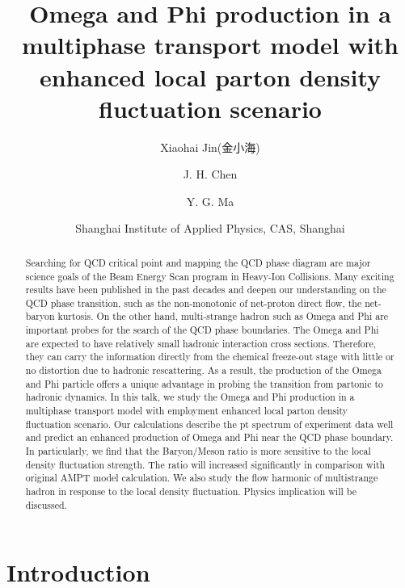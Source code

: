 \documentclass[11pt,a4paper,openany]{article}
\title{\vspace{-20mm}\textbf{\Large Omega and Phi production in a multiphase transport model with enhanced local parton
density fluctuation scenario}}
\author{Xiaohai Jin(金小海) \and J. H. Chen \and Y. G. Ma}
\date{Shanghai Institute of Applied Physics, CAS, Shanghai}
\begin{document}
\maketitle

\begin{abstract}
  Searching for QCD critical point and mapping the QCD phase diagram are major science goals of the Beam Energy Scan program in Heavy-Ion Collisions. Many exciting results have been published in the past decades and deepen our understanding on the QCD phase transition, such as the non-monotonic of net-proton direct flow, the net-baryon kurtosis. On the other hand, multi-strange hadron such as Omega and Phi are important probes for the search of the QCD phase boundaries. The Omega and Phi are expected to have relatively small hadronic interaction cross sections. Therefore, they can carry the information directly from the chemical freeze-out stage with little or no distortion due to hadronic rescattering. As a result, the production of the Omega and Phi particle offers a unique advantage in probing the transition from partonic to hadronic dynamics.  In this talk, we study the Omega and Phi production in a multiphase transport model with employment enhanced local parton density fluctuation scenario. Our calculations describe the pt spectrum of experiment data well and predict an enhanced production of Omega and Phi near the QCD phase boundary. In particularly, we find that the Baryon/Meson ratio is more sensitive to the local density fluctuation strength. The ratio will increased significantly in comparison with original AMPT model calculation. We also study the flow harmonic of multistrange hadron in response to the local density fluctuation. Physics implication will be discussed. 
\end{abstract}

\section{Introduction}
\end{document}
